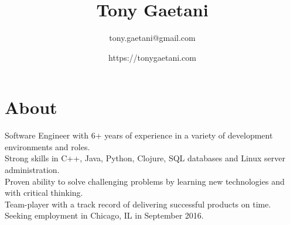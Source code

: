 \documentclass[10pt]{article}
\title{\bfseries\Large Tony Gaetani}
\author{tony.gaetani@gmail.com}
\date{https://tonygaetani.com}
\begin{document}
\maketitle

\section*{About}
Software Engineer with 6+ years of experience in a variety of development environments and roles.\\
Strong skills in C++, Java, Python, Clojure, SQL databases and Linux server administration.\\
Proven ability to solve challenging problems by learning new technologies and with critical thinking.\\
Team-player with a track record of delivering successful products on time.\\
Seeking employment in Chicago, IL in September 2016.\\
\end{document}
